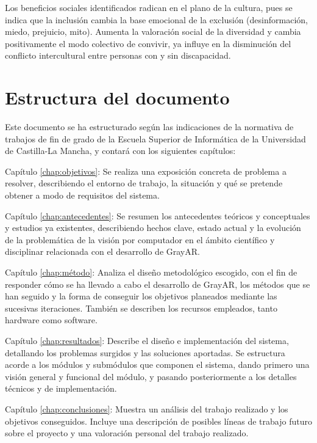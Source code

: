 Los beneficios sociales identificados radican en el plano de la cultura, pues se indica que la inclusión cambia la base emocional de la exclusión (desinformación, miedo, prejuicio, mito). Aumenta la valoración social de la diversidad  y cambia positivamente el modo colectivo de convivir, ya influye en la disminución del conflicto intercultural entre personas con y sin discapacidad.
 
\section{Estructura del documento}

  Este documento se ha estructurado según las indicaciones de la normativa de trabajos de fin de grado de la Escuela Superior de Informática de la Universidad de Castilla-La Mancha, y contará con los siguientes capítulos:
  \begin{definitionlist}
  \item[Capítulo \ref{chap:objetivos}: \nameref{chap:objetivos}] Se realiza una exposición concreta de problema a resolver, describiendo el entorno de trabajo, la situación y qué se pretende obtener a modo de requisitos del sistema.

  \item[Capítulo \ref{chap:antecedentes}: \nameref{chap:antecedentes}] Se resumen los antecedentes teóricos y conceptuales y estudios ya existentes, describiendo hechos clave, estado actual y la evolución de la problemática de la visión por computador en el ámbito científico y disciplinar relacionada con el desarrollo de GrayAR.

  \item[Capítulo \ref{chap:método}: \nameref{chap:método}] Analiza el diseño metodológico escogido, con el fin de responder cómo se ha llevado a cabo el desarrollo de GrayAR, los métodos que se han seguido y la forma de conseguir los objetivos planeados mediante las sucesivas iteraciones. También se describen los recursos empleados, tanto hardware como software.

  \item[Capítulo \ref{chap:resultados}: \nameref{chap:resultados}] Describe el diseño e implementación del sistema, detallando los problemas surgidos y las soluciones aportadas. Se estructura acorde a los módulos y
submódulos que componen el sistema, dando primero una visión general y funcional del módulo, y pasando posteriormente a los detalles técnicos y de implementación.

  \item[Capítulo \ref{chap:conclusiones}: \nameref{chap:conclusiones}] Muestra un análisis del trabajo realizado y los objetivos conseguidos. Incluye una descripción de posibles líneas de trabajo futuro sobre el proyecto y una valoración personal del trabajo realizado.

  \end{definitionlist}



